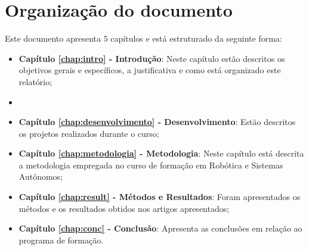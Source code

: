 \section{Organização do documento}
\label{section:organizacao}

Este documento apresenta $5$ capítulos e está estruturado da seguinte forma:

\begin{itemize}


  \item \textbf{Capítulo \ref{chap:intro} - Introdução}: Neste capítulo estão descritos os objetivos gerais e específicos, a justificativa e como está organizado este relatório;
  \item  \item \textbf{Capítulo \ref{chap:desenvolvimento} - Desenvolvimento}: Estão descritos os projetos realizados durante o curso;
  \item \textbf{Capítulo \ref{chap:metodologia} - Metodologia}: Neste capítulo está descrita a metodologia empregada no curso de formação em Robótica e Sistemas Autônomos; 
  \item \textbf{Capítulo \ref{chap:result} - Métodos e Resultados}: Foram apresentados os métodos e os resultados obtidos nos artigos apresentados;
  \item \textbf{Capítulo \ref{chap:conc} - Conclusão}: Apresenta as conclusões em relação ao programa de formação.

\end{itemize}
